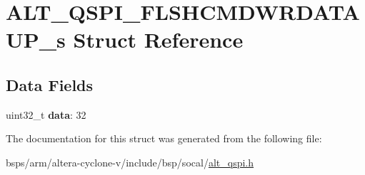\hypertarget{structALT__QSPI__FLSHCMDWRDATAUP__s}{}\section{A\+L\+T\+\_\+\+Q\+S\+P\+I\+\_\+\+F\+L\+S\+H\+C\+M\+D\+W\+R\+D\+A\+T\+A\+U\+P\+\_\+s Struct Reference}
\label{structALT__QSPI__FLSHCMDWRDATAUP__s}
\subsection*{Data Fields}
\begin{DoxyCompactItemize}
\item 
\mbox{\label{structALT__QSPI__FLSHCMDWRDATAUP__s_ac2a48f98c08395c7739735b074e00917}} 
uint32\+\_\+t {\bfseries data}\+: 32
\end{DoxyCompactItemize}


The documentation for this struct was generated from the following file\+:\begin{DoxyCompactItemize}
\item 
bsps/arm/altera-\/cyclone-\/v/include/bsp/socal/\mbox{\hyperlink{include_2bsp_2socal_2alt__qspi_8h}{alt\+\_\+qspi.\+h}}\end{DoxyCompactItemize}
